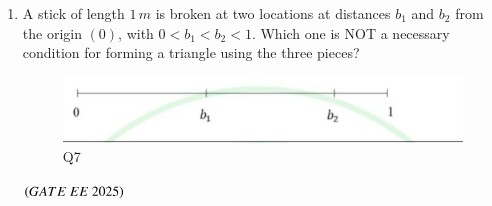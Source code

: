 \documentclass[journal,12pt,onecolumn]{IEEEtran}
\theoremstyle{remark}
\begin{document}
\begin{enumerate}
  \item A stick of length $1\,m$ is broken at two locations at distances $b_1$ and $b_2$ from the origin $(0)$, with $0<b_1<b_2<1$. Which one is NOT a necessary condition for forming a triangle using the three pieces? 
  \begin{figure}[H]
\centering
\caption{Q7}
\label{Q7}
\includegraphics[scale=0.5]{figs/Q7.jpg}
\end{figure}
\hfill $\left(GATE\ EE\ 2025\right)$
\begin{enumerate}
\end{enumerate}


\end{enumerate}
\end{document}
